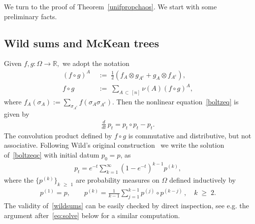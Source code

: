 \documentclass[AHL,Unicode,longabstracts,published]{cedram}
\renewcommand{\geq}{\;\geqslant\;}
\newcommand{\Om}{\Omega}
\newcommand{\si}{\sigma}
\newcommand{\bbR}{\mathbb{R}}
\begin{document}
We turn to the proof of Theorem~\ref{unifpropchaos}. We start with some preliminary facts.



\subsection{Wild sums and McKean trees}

Given $f, g : \Om \rightarrow \bbR,$ we adopt the notation
\begin{align}
(f \circ g)^{A}\; &{:=}\; \frac{1}{2}\left(f_A \otimes g_{A^c}+ g_A \otimes f_{A^c} \right),\label{defconv1}\\
f \circ g \;&{:=}\; \sum_{A\,\subset\,[n]}\nu(A)(f \circ g)^{A},\label{defconv2}
\end{align}
where $f_A(\si_{A}) := \sum_{\si_{A^c}}f(\si_A\si_{A^c})$. Then the nonlinear equation~\eqref{boltzeq} is given by
\begin{align}\label{boltzeqc}
\frac{d}{dt}\,p_t = p_t\circ p_t - p_t.
\end{align}
The convolution product defined by $f\circ g$ is commutative and distributive, but not associative. Following Wild's original construction~\cite{Wild} we write the solution of~\eqref{boltzeqc} with initial datum $p_0=p$, as
\begin{align}\label{wildsums}
p_t = e^{-t}\sum_{k=1}^{\infty}\left(1-e^{-t}\right)^{k-1}p^{(k)},
\end{align}
where the $\{p^{(k)}\}_{k\,\geq\,1}$ are probability measures on $\Om$ defined inductively by
\begin{align}\label{eq:wildp}
p^{(1)}=p, \qquad p^{(k)} = \frac{1}{k-1}\sum_{j=1}^{k-1}p^{(j)}\circ p^{(k-j)}\,,\quad k\geq 2.
\end{align}
The validity of~\eqref{wildsums} can be easily checked by direct inspection, see e.g. the argument after~\eqref{eq:solve} below for a similar computation.
\end{document}
